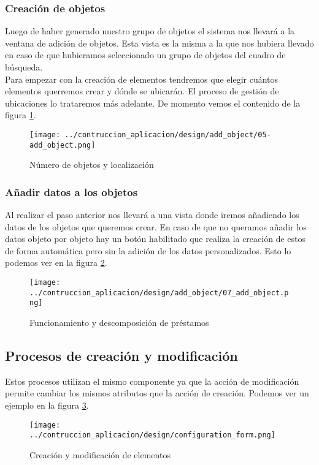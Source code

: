 \subsubsection{Creación de objetos}
Luego de haber generado nuestro grupo de objetos el sistema nos llevará a la ventana de adición de objetos. Esta vista es la misma a la que nos hubiera llevado en caso de que hubieramos seleccionado un grupo de objetos del cuadro de búsqueda.
\\Para empezar con la creación de elementos tendremos que elegir cuántos elementos querremos crear y dónde se ubicarán. El proceso de gestión de ubicaciones lo trataremos más adelante. De momento vemos el contenido de la figura \ref{fig:4-creation-o}.

\begin{figure}[h]
    \centering
    \texttt{[image: ../contruccion\_aplicacion/design/add\_object/05-add\_object.png]}
    \caption{Número de objetos y localización}\label{fig:4-creation-o}
\end{figure}

\subsubsection{Añadir datos a los objetos}
Al realizar el paso anterior nos llevará a una vista donde iremos añadiendo los datos de los objetos que queremos crear. En caso de que no queramos añadir los datos objeto por objeto hay un botón habilitado que realiza la creación de estos de forma automática pero sin la adición de los datos personalizados. Esto lo podemos ver en la figura \ref{fig:5-creation-o}.
\begin{figure}[h]
    \centering
    \texttt{[image: ../contruccion\_aplicacion/design/add\_object/07\_add\_object.png]}
    \caption{Funcionamiento y descomposición de préstamos}\label{fig:5-creation-o}
\end{figure}

\subsection{Procesos de creación y modificación}
Estos procesos utilizan el mismo componente ya que la acción de modificación permite cambiar los mismos atributos que la acción de creación. Podemos ver un ejemplo en la figura \ref{fig:creation-and-modification}.
\begin{figure}[h]
    \centering
    \texttt{[image: ../contruccion\_aplicacion/design/configuration\_form.png]}
    \caption{Creación y modificación de elementos}\label{fig:creation-and-modification}
\end{figure}
